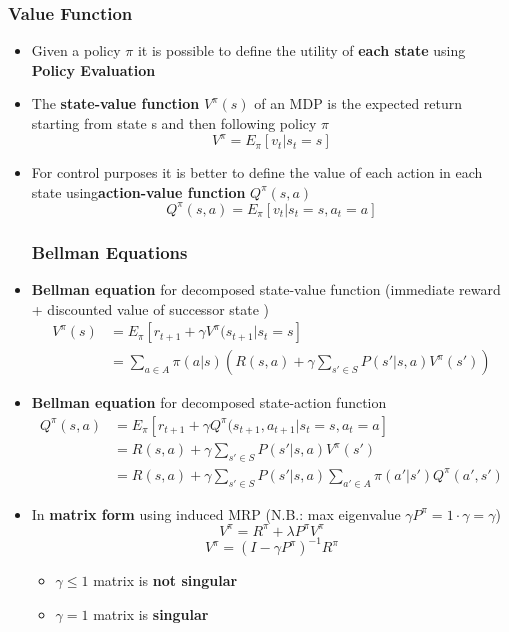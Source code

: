 \documentclass[12pt]{article} %
\begin{document}
\subsubsection{Value Function}
\begin{itemize}
\item Given a policy $\pi$ it is possible to define the utility of \textbf{each state} using \textbf{Policy Evaluation}

\item The \textbf{state-value function } $V^{\pi}(s)$ of an MDP is the expected return starting from state s and then following policy $\pi$
$$ V^{\pi} = E_{\pi} [v_t|s_t=s]$$

\item For control purposes it is better to define the value of each action in each state using\textbf{action-value function } $Q^{\pi}(s,a)$ 
$$ Q^{\pi}(s,a)= E_{\pi}[v_t | s_t = s,a_t=a]$$

\subsubsection{Bellman Equations}
\item \textbf{Bellman equation} for decomposed state-value function  (immediate reward + discounted value of successor state )
\begin{align*}
 V^{\pi}(s) &= E_{\pi}[r_{t+1}+ \gamma V^{\pi}(s_{t+1}| s_t = s]\\
 &= \sum_{a \in A} \pi(a|s) \left( R(s,a)+ \gamma \sum_{s' \in S}P(s'|s,a)V^{\pi}(s') \right)
\end{align*}

\item \textbf{Bellman equation} for decomposed state-action function
\begin{align*}
 Q^{\pi}(s,a) &= E_{\pi}[r_{t+1}+ \gamma Q^{\pi}(s_{t+1},a_{t+1}| s_t = s,a_t=a]\\
 &= R(s,a)+ \gamma \sum_{s'\in S}P(s'|s,a)V^{\pi}(s') \\
 &= R(s,a)+ \gamma \sum_{s'\in S}P(s'|s,a) \sum_{a' \in A} \pi(a'|s')Q^{\pi}(a',s')
\end{align*}

\item In  \textbf{matrix form} using induced MRP (N.B.: max eigenvalue $\gamma P^{\pi} = 1 \cdot \gamma = \gamma$)
$$ V^{\pi} = R^{\pi} + \lambda P^{\pi}V^{\pi}$$
$$ V^{\pi} = (I - \gamma P^{\pi})^{-1}R^{\pi}$$
\begin{itemize}
\item $\gamma \leq 1$ matrix is \textbf{not singular}
\item $\gamma =1$ matrix is \textbf{singular}
\end{itemize}
\end{itemize}
\end{document}

